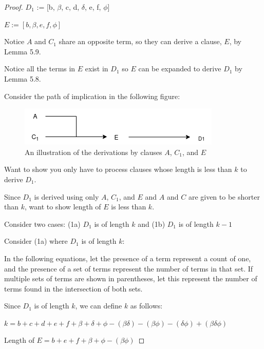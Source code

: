\documentclass[manuscript]{acmart}
\begin{document}
\begin{proof}
        $D_1$ := [b, $\beta$, c, d, $\delta$, e, f, $\phi$]

        $E := [b, \beta, e, f, \phi]$

        Notice $A$ and $C_1$ share an opposite term, so they can derive a clause, $E$, by Lemma 5.9. 
        
        Notice all the terms in $E$ exist in $D_1$ so $E$ can be expanded to derive $D_1$ by Lemma 5.8.

        Consider the path of implication in the following figure:

        \begin{figure}[h]
            \includegraphics[scale=0.8]{318b.png}
            \caption{An illustration of the derivations by clauses $A$, $C_1$, and $E$}
        \end{figure}

        Want to show you only have to process clauses whose length is
        less than $k$ to derive $D_1$.

        Since $D_1$ is derived using only $A$, $C_1$, and $E$ and $A$ and $C$ are given to be shorter than $k$, want to show length of $E$ is less than $k$.

        Consider two cases: (1a) $D_1$ is of length $k$ and (1b) $D_1$ is of length $k - 1$
        
        Consider (1a) where $D_1$ is of length $k$:

        In the following equations, let the presence of a term represent a count of one, and the presence of a set of terms represent the number of terms in that set. If multiple sets of terms are shown in parentheses, let this represent the number of terms found in the intersection of both sets.

        Since $D_1$ is of length $k$, we can define $k$ as follows:

        $k = b + c + d + e + f + \beta + \delta + \phi - (\beta \delta) 
        - (\beta \phi) - (\delta \phi) + (\beta \delta \phi)$

        Length of $E = b + e + f + \beta + \phi - (\beta \phi)$
        

\end{proof}
\end{document}
